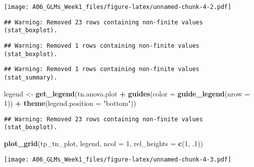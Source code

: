 \documentclass[]{article}
\newenvironment{Shaded}{\begin{snugshade}}{\end{snugshade}}
\newcommand{\CommentTok}[1]{\textcolor[rgb]{0.56,0.35,0.01}{\textit{#1}}}
\newcommand{\DataTypeTok}[1]{\textcolor[rgb]{0.13,0.29,0.53}{#1}}
\newcommand{\DecValTok}[1]{\textcolor[rgb]{0.00,0.00,0.81}{#1}}
\newcommand{\FloatTok}[1]{\textcolor[rgb]{0.00,0.00,0.81}{#1}}
\newcommand{\KeywordTok}[1]{\textcolor[rgb]{0.13,0.29,0.53}{\textbf{#1}}}
\newcommand{\NormalTok}[1]{#1}
\newcommand{\OperatorTok}[1]{\textcolor[rgb]{0.81,0.36,0.00}{\textbf{#1}}}
\newcommand{\StringTok}[1]{\textcolor[rgb]{0.31,0.60,0.02}{#1}}
\begin{document}
\texttt{[image: A06\_GLMs\_Week1\_files/figure-latex/unnamed-chunk-4-2.pdf]}

\begin{Shaded}
\end{Shaded}

\begin{verbatim}
## Warning: Removed 23 rows containing non-finite values (stat_boxplot).
\end{verbatim}

\begin{verbatim}
## Warning: Removed 1 rows containing non-finite values (stat_boxplot).
\end{verbatim}

\begin{verbatim}
## Warning: Removed 1 rows containing non-finite values (stat_summary).
\end{verbatim}

\begin{Shaded}
\begin{Highlighting}[]
\NormalTok{legend <-}\StringTok{ }\KeywordTok{get_legend}\NormalTok{(tn.anova.plot }\OperatorTok{+}\StringTok{ }\KeywordTok{guides}\NormalTok{(}\DataTypeTok{color =} \KeywordTok{guide_legend}\NormalTok{(}\DataTypeTok{nrow =} \DecValTok{1}\NormalTok{)) }\OperatorTok{+}\StringTok{ }\KeywordTok{theme}\NormalTok{(}\DataTypeTok{legend.position =} \StringTok{"bottom"}\NormalTok{))}
\end{Highlighting}
\end{Shaded}

\begin{verbatim}
## Warning: Removed 23 rows containing non-finite values (stat_boxplot).
\end{verbatim}

\begin{Shaded}
\begin{Highlighting}[]
\KeywordTok{plot_grid}\NormalTok{(tp_tn_plot, legend, }\DataTypeTok{ncol =} \DecValTok{1}\NormalTok{, }\DataTypeTok{rel_heights =} \KeywordTok{c}\NormalTok{(}\DecValTok{1}\NormalTok{, }\FloatTok{.1}\NormalTok{))}
\end{Highlighting}
\end{Shaded}

\texttt{[image: A06\_GLMs\_Week1\_files/figure-latex/unnamed-chunk-4-3.pdf]}
\end{document}
